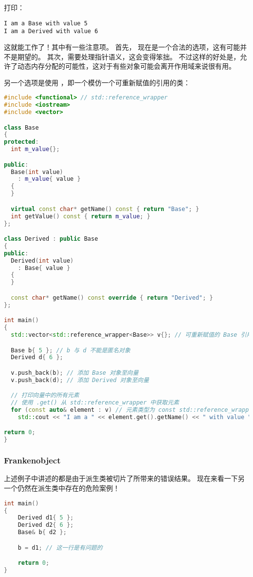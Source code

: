 \documentclass[../../LearnCpp.tex]{subfiles}
\begin{document}
打印：

\begin{lstlisting}
I am a Base with value 5
I am a Derived with value 6
\end{lstlisting}

这就能工作了！其中有一些注意项。
首先， 现在是一个合法的选项，这有可能并不是期望的。
其次，需要处理指针语义，这会变得笨拙。
不过这样的好处是，允许了动态内存分配的可能性，这对于有些对象可能会离开作用域来说很有用。

另一个选项是使用 ，即一个模仿一个可重新赋值的引用的类：

\begin{lstlisting}[language=C++]
#include <functional> // std::reference_wrapper
#include <iostream>
#include <vector>

class Base
{
protected:
  int m_value{};

public:
  Base(int value)
    : m_value{ value }
  {
  }

  virtual const char* getName() const { return "Base"; }
  int getValue() const { return m_value; }
};

class Derived : public Base
{
public:
  Derived(int value)
    : Base{ value }
  {
  }

  const char* getName() const override { return "Derived"; }
};

int main()
{
  std::vector<std::reference_wrapper<Base>> v{}; // 可重新赋值的 Base 引用的向量

  Base b{ 5 }; // b 与 d 不能是匿名对象
  Derived d{ 6 };

  v.push_back(b); // 添加 Base 对象至向量
  v.push_back(d); // 添加 Derived 对象至向量

  // 打印向量中的所有元素
  // 使用 .get() 从 std::reference_wrapper 中获取元素
  for (const auto& element : v) // 元素类型为 const std::reference_wrapper<Base>&
    std::cout << "I am a " << element.get().getName() << " with value " << element.get().getValue() << '\n';

return 0;
}
\end{lstlisting}

\subsubsection*{Frankenobject}

上述例子中讲述的都是由于派生类被切片了所带来的错误结果。
现在来看一下另一个仍然在派生类中存在的危险案例！

\begin{lstlisting}[language=C++]
int main()
{
    Derived d1{ 5 };
    Derived d2{ 6 };
    Base& b{ d2 };

    b = d1; // 这一行是有问题的

    return 0;
}
\end{lstlisting}
\end{document}
